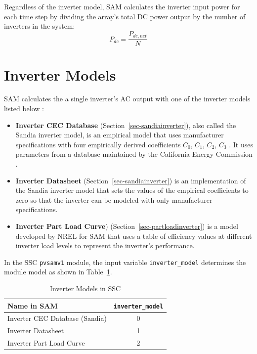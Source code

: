 \documentclass[12pt,letterpaper]{article}
\begin{document}
Regardless of the inverter model, SAM calculates the inverter input power for each time step by dividing the array's total DC power output by the number of inverters in the system:
\begin{equation}\label{eqn-invinputpower}
P_{dc} = \frac{P_{dc,net}}{N}
\end{equation}

\section{Inverter Models}\label{sec-inverteroptions}

SAM calculates the a single inverter's AC output with one of the inverter models listed below \citep{blair2013}:

\begin{itemize}
\item \textbf{Inverter CEC Database} (Section~\ref{sec-sandiainverter}), also called the Sandia inverter model, is an empirical model that uses manufacturer specifications with four empirically derived coefficients $C_0$, $C_1$, $C_2$, $C_3$ \citep{king2007}. It uses parameters from a database maintained by the California Energy Commission \citep{gsc2014a}.
\item \textbf{Inverter Datasheet} (Section~\ref{sec-sandiainverter}) is an implementation of the Sandia inverter model that sets the values of the empirical coefficients to zero so that the inverter can be modeled with only manufacturer specifications.
\item \textbf{Inverter Part Load Curve}) (Section~\ref{sec-partloadinverter}) is a model developed by NREL for SAM that uses a table of efficiency values at different inverter load levels to represent the inverter's performance.
\end{itemize}

In the SSC \texttt{pvsamv1} module, the input variable \texttt{inverter\_model} determines the module model as shown in Table~\ref{tab-invertersubmodels}.

\begin{table}
\begin{center}
\caption{Inverter Models in SSC}
\begin{tabular}{lc}
\midrule
Name in SAM & \texttt{inverter\_model} \\
\midrule
Inverter CEC Database (Sandia) & 0 \\
Inverter Datasheet & 1 \\
Inverter Part Load Curve & 2 \\
\hline
\end{tabular}
\label{tab-invertersubmodels}
\end{center}
\end{table}
\end{document}
